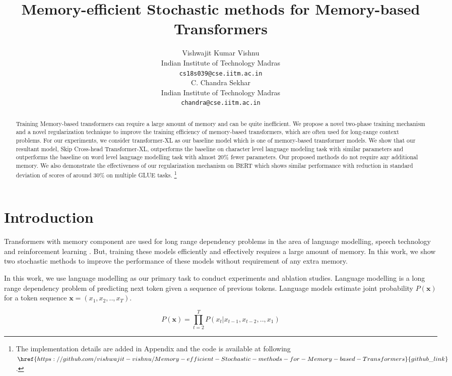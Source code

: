 \documentclass[11pt]{article}
\title{Memory-efficient Stochastic methods for Memory-based Transformers}
\author{Vishwajit Kumar Vishnu \\
  Indian Institute of Technology Madras \\
  \texttt{cs18s039@cse.iitm.ac.in} \\\And
  C. Chandra Sekhar \\
  Indian Institute of Technology Madras \\
  \texttt{chandra@cse.iitm.ac.in} \\}
\begin{document}
\maketitle
\begin{abstract}
Training Memory-based transformers can require a large amount of memory and can be quite inefficient. We propose a novel two-phase training mechanism and a novel regularization technique to improve the training efficiency of memory-based transformers, which are often used for long-range context problems. For our experiments, we consider transformer-XL as our baseline model which is one of memory-based transformer models. We show that our resultant model, Skip Cross-head Transformer-XL, outperforms the baseline on character level language modeling task with similar parameters and outperforms the baseline on word level language modelling task with almost 20\% fewer parameters. Our proposed methods do not require any additional memory. We also demonstrate the effectiveness of our regularization mechanism on BERT which shows similar performance with reduction in standard deviation of scores of around 30\% on multiple GLUE tasks. \footnote{ The implementation details are added in Appendix and   the code is available at following $\href{https://github.com/vishwajit-vishnu/Memory-efficient-Stochastic-methods-for-Memory-based-Transformers}{github\_link}$.}

\end{abstract}

\section{Introduction}

Transformers with memory component are used for long range dependency problems in the area of language modelling, speech technology and reinforcement learning \citep{DBLP:conf/iclr/RaePJHL20}. But, training these models efficiently and effectively requires a large amount of memory. In this work, we show two stochastic methods to improve the performance of these models without requirement of any extra memory. 

In this work, we use language modelling as our primary task to conduct experiments and ablation studies. Language modelling is a long range dependency problem of predicting next token given a sequence of previous tokens. Language models estimate joint probability $P(\mathbf{x})$  for a token sequence $\mathbf{x}= (x_1, x_2, .. , x_T) $.

\[
    P(\mathbf{x}) = \prod_{t=2}^{T} P(x_t | x_{t-1}, x_{t-2}, .. , x_1)
\]
\end{document}
